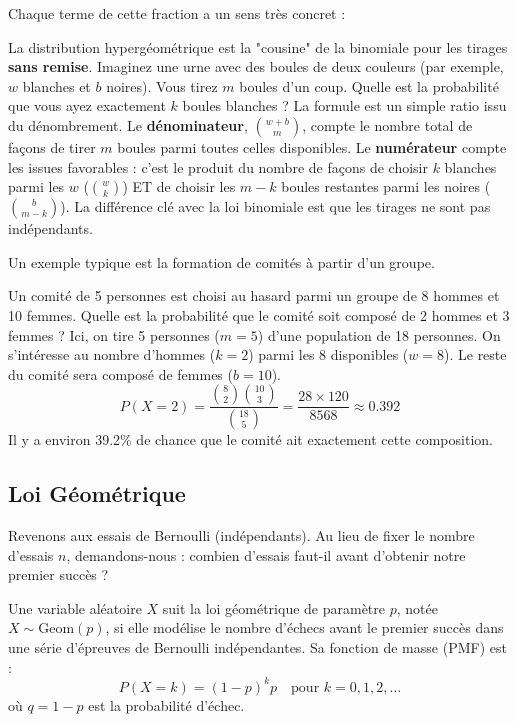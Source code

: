 Chaque terme de cette fraction a un sens très concret :

\begin{intuitionbox}
La distribution hypergéométrique est la "cousine" de la binomiale pour les tirages \textbf{sans remise}. Imaginez une urne avec des boules de deux couleurs (par exemple, $w$ blanches et $b$ noires). Vous tirez $m$ boules d'un coup. Quelle est la probabilité que vous ayez exactement $k$ boules blanches ?
La formule est un simple ratio issu du dénombrement. Le \textbf{dénominateur}, $\binom{w+b}{m}$, compte le nombre total de façons de tirer $m$ boules parmi toutes celles disponibles. Le \textbf{numérateur} compte les issues favorables : c'est le produit du nombre de façons de choisir $k$ blanches parmi les $w$ ($\binom{w}{k}$) ET de choisir les $m-k$ boules restantes parmi les noires ($\binom{b}{m-k}$). La différence clé avec la loi binomiale est que les tirages ne sont pas indépendants.
\end{intuitionbox}

Un exemple typique est la formation de comités à partir d'un groupe.

\begin{examplebox}
Un comité de 5 personnes est choisi au hasard parmi un groupe de 8 hommes et 10 femmes. Quelle est la probabilité que le comité soit composé de 2 hommes et 3 femmes ?
Ici, on tire 5 personnes ($m=5$) d'une population de 18 personnes. On s'intéresse au nombre d'hommes ($k=2$) parmi les 8 disponibles ($w=8$). Le reste du comité sera composé de femmes ($b=10$).
$$ P(X=2) = \frac{\binom{8}{2} \binom{10}{3}}{\binom{18}{5}} = \frac{28 \times 120}{8568} \approx 0.392 $$
Il y a environ 39.2\% de chance que le comité ait exactement cette composition.
\end{examplebox}

\subsection{Loi Géométrique}

Revenons aux essais de Bernoulli (indépendants). Au lieu de fixer le nombre d'essais $n$, demandons-nous : combien d'essais faut-il avant d'obtenir notre premier succès ?

\begin{theorembox}
Une variable aléatoire $X$ suit la loi géométrique de paramètre $p$, notée $X \sim \text{Geom}(p)$, si elle modélise le nombre d'échecs avant le premier succès dans une série d'épreuves de Bernoulli indépendantes. Sa fonction de masse (PMF) est :
$$ P(X=k) = (1-p)^k p \quad \text{pour } k=0, 1, 2, \dots $$
où $q = 1-p$ est la probabilité d'échec.
\end{theorembox}

